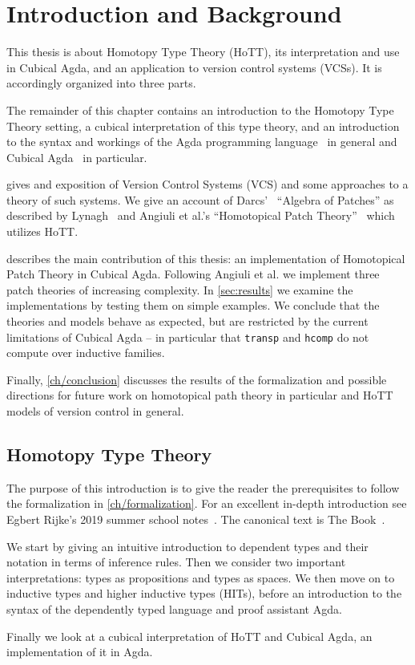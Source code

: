 \chapter{Introduction and Background}\label{ch/intro}

This thesis is about Homotopy Type Theory (HoTT), its interpretation and use in
Cubical Agda, and an application to version control systems (VCSs).
It is accordingly organized into three parts.

The remainder of this chapter contains an introduction to the Homotopy Type Theory
setting, a cubical interpretation of this type theory, and an introduction to
the syntax and workings of the Agda programming language~\cite{Agda} in general and Cubical
Agda~\cite{vezzosi2021cubical} in particular.

 gives and exposition of Version Control Systems (VCS) and some
approaches to a theory of such systems. We give an account of
Darcs'~\cite{Darcs} ``Algebra of Patches'' as described by
Lynagh~\cite{Lynagh2006} and Angiuli et al.'s ``Homotopical Patch
Theory''~\cite{Angiuli2016} which utilizes HoTT.

 describes the main contribution of this thesis: an
implementation of Homotopical Patch Theory in Cubical Agda. Following Angiuli et
al. we implement three patch theories of increasing complexity. In
\autoref{sec:results} we examine the implementations by testing them on simple
examples. We conclude that the theories and models behave as expected, but are
restricted by the current limitations of Cubical Agda -- in particular that
\texttt{transp} and \texttt{hcomp} do not compute over inductive families.

Finally, \autoref{ch/conclusion} discusses the results of the formalization and
possible directions for future work on homotopical path theory in particular and
HoTT models of version control in general.

\section{Homotopy Type Theory}

The purpose of this introduction is to give the reader the prerequisites to
follow the formalization in \autoref{ch/formalization}. For an excellent
in-depth introduction see Egbert Rijke's 2019 summer school
notes~\cite{Rijke2019}. The canonical text is The Book~\cite{hottbook}.

We start by giving an intuitive introduction to dependent types and their
notation in terms of inference rules. Then we consider two important
interpretations: types as propositions and types as spaces. We then move on to
inductive types and higher inductive types (HITs), before an introduction to the
syntax of the dependently typed language and proof assistant Agda.

Finally we look at a cubical interpretation of HoTT and Cubical Agda, an
implementation of it in Agda.